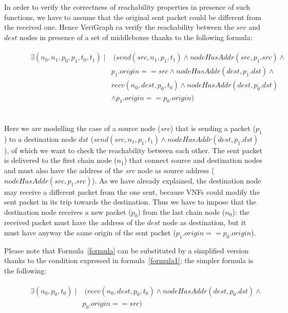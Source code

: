 In order to verify the correctness of reachability properties in presence of such functions, we have to assume that the original sent packet could be different from the received one. Hence VeriGraph ca verify the reachability between the \textit{$src$} and \textit{$dest$} nodes in presence of a set of middleboxes thanks to the following formula:
\begin{figure}[h]
	{\footnotesize
		\begin{subequations}
			\begin{align}
				\begin{split}
				\exists (n_{0}, n_{1}, p_{0}, p_{1}, t_{0}, t_{1}) \; |&  \; (send(src, n_{1}, p_{1}, t_{1}) \wedge nodeHasAddr(src, p_{1}.src) \wedge \\
				& p_{1}.origin == src  \wedge nodeHasAddr(dest, p_{1}.dst) \wedge   \\
				&  recv(n_{0}, dest, p_{0}, t_{0}) \wedge nodeHasAddr(dest, p_{0}.dst) \\
				& \wedge p_{1}.origin == p_{0}.origin )
				\end{split}
			\end{align}
			\label{formula}
		\end{subequations}}
\end{figure}
\\
Here we are modelling the case of a source node (\textit{$src$}) that is sending a packet (\textit{$p_{1}$}) to a destination node \textit{$dst$} (\textit{$send(src, n_{1}, p_{1}, t_{1}) \wedge nodeHasAddr(dest, p_{1}.dst)$}), of which we want to check the reachability between each other. The sent packet is delivered to the first chain node (\textit{$n_{1}$}) that connect source and destination nodes and must also have the address of the \textit{$src$} node as source address (\textit{$nodeHasAddr(src, p_{1}.src)$}). As we have already explained, the destination node may receive a different packet from the one sent, because VNFs could modify the sent packet in its trip towards the destination. Thus we have to impose that the destination node receives a new packet (\textit{$p_{0}$}) from the last chain node (\textit{$n_{0}$}): the received packet  must have the address of the \textit{$dest$} node as destination, but it must have anyway the same origin of the sent packet (\textit{$p_{1}.origin == p_{0}.origin $}).

Please note that Formula~\ref{formula} can be substituted by a simplified version thanks to the condition expressed in formula~\ref{formula1}; the simpler formula is the following: 
\begin{figure}[h]
	{\footnotesize
		\begin{subequations}
			\begin{align}
				\begin{split}
					\exists (n_{0}, p_{0}, t_{0}) \; |&  \; (recv(n_{0}, dest, p_{0}, t_{0}) \wedge nodeHasAddr(dest, p_{0}.dst) \wedge \\
					& p_{0}.origin == src )
				\end{split}
			\end{align}
		\end{subequations}}
\end{figure}
